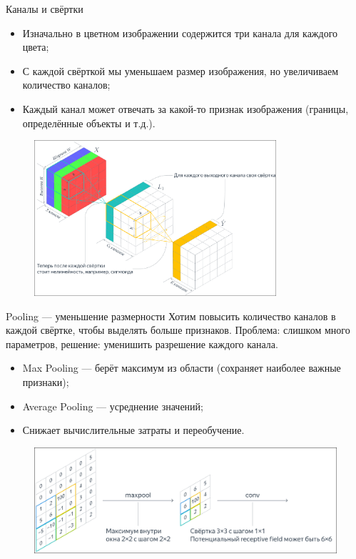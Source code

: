 \documentclass[notheorems, handout]{beamer}
\begin{document}
\begin{frame}{Каналы и свёртки}
    \begin{itemize}
        \item Изначально в цветном изображении содержится три канала для каждого цвета;
        \item С каждой свёрткой мы уменьшаем размер изображения, но увеличиваем количество каналов;
        \item Каждый канал может отвечать за какой-то признак изображения (границы, определённые объекты и т.д.).
    \end{itemize}
    \begin{figure}
        \includegraphics[width=0.8\textwidth]{img/canals.png}
    \end{figure}
\end{frame}

\begin{frame}{Pooling — уменьшение размерности}
    Хотим повысить количество каналов в каждой свёртке, чтобы выделять больше признаков. Проблема: слишком много параметров, решение: уменишить разрешение каждого канала.

    \begin{itemize}
        \item Max Pooling — берёт максимум из области (сохраняет наиболее важные признаки);
        \item Average Pooling — усреднение значений;
        \item Снижает вычислительные затраты и переобучение.
    \end{itemize}
    \begin{figure}
        \includegraphics[width=\linewidth]{img/max_pooling.png}        
    \end{figure}
\end{frame}
\end{document}
